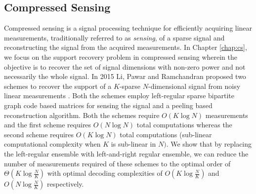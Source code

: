 \subsection*{Compressed Sensing}
Compressed sensing is a signal processing technique for efficiently acquiring linear measurements, traditionally referred to as \textit{sensing}, of a sparse signal and reconstructing the signal from the acquired measurements. In Chapter \ref{chap:cs}, we focus on the support recovery problem in compressed sensing wherein the objective is to recover the set of signal dimensions with non-zero power and not necessarily the whole signal. In 2015 Li, Pawar and Ramchandran proposed two schemes to recover the support of a $K$-sparse $N$-dimensional signal from noisy linear measurements \cite{li2015subdraft,li2015subisit}. Both the schemes employ left-regular sparse bipartite graph code based matrices for sensing the signal and a peeling based reconstruction algorithm. Both the schemes require $O(K \log N)$ measurements and the first scheme requires $O(N \log N)$ total computations whereas the second scheme requires $O(K \log N)$ total computations (sub-linear computational complexity when $K$ is sub-linear in $N)$. We show that by replacing the left-regular ensemble with left-and-right regular ensemble, we can reduce the number of measurements required of these schemes to the optimal order of $\Theta\left(K \log \frac{N}{K} \right)$ with optimal decoding complexities of $O(K \log \frac{N}{K})$ and $O(N \log \frac{N}{K})$ respectively.

